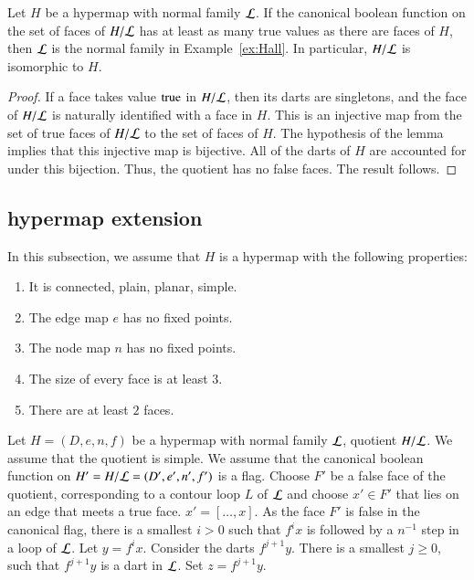 \begin{lemma}  
Let $H$ be a hypermap with normal family ${\cal L}$. If the canonical boolean function on the set of faces of $H/{\cal L}$ has at least as many true values as there are faces of $H$, then $\cal L$ is the normal family in Example~\ref{ex:Hall}. In particular, $H/{\cal L}$ is isomorphic to $H$.
\end{lemma}

\begin{proof}  If a face takes value ${\operatorname{true}}$ in $H/{\cal L}$, then its darts are singletons, and the face of $H/{\cal L}$ is naturally identified with a face in $H$.  This is an injective map from the set of true faces of $H/{\cal L}$ to the set of faces of $H$.  The hypothesis of the lemma implies that this injective map is bijective. All of the darts of $H$ are accounted for under this bijection. Thus, the quotient has no false faces.  The result follows.
\end{proof}


\subsection{hypermap extension}\label{sec:face-insert}

In this subsection, we assume that $H$ is a hypermap with the following properties:
    \begin{enumerate}
        \item It is connected, plain, planar, simple.
        \item The edge map $e$ has no fixed points.
        \item The node map $n$ has no fixed points.
        \item The size of every face is at least $3$.
        \item There are at least $2$ faces. 
    \end{enumerate}

Let $H=(D,e,n,f)$ be a hypermap with normal family $\cal L$, quotient $H/{\cal L}$.  We assume that the quotient is simple.  We assume that the canonical boolean function on $H'=H/{\cal L} = (D',e',n',f')$ is a flag.  Choose $F'$ be a false face of the quotient, corresponding to a contour loop $L$ of ${\cal L}$ and choose $x'\in F'$ that lies on an edge that meets a true face.   $x' = [\ldots,x]$.  As the face $F'$ is false in the canonical flag, there is a smallest $i>0$ such that $f^i x$ is followed by a $n^{-1}$ step in a loop of ${\cal L}$. Let $y = f^i x$. Consider the darts $f^{j+1} y$.  There is a smallest $j\ge0$, such that $f^{j+1} y$ is a dart in ${\cal L}$.  Set $z=f^{j+1} y$.

